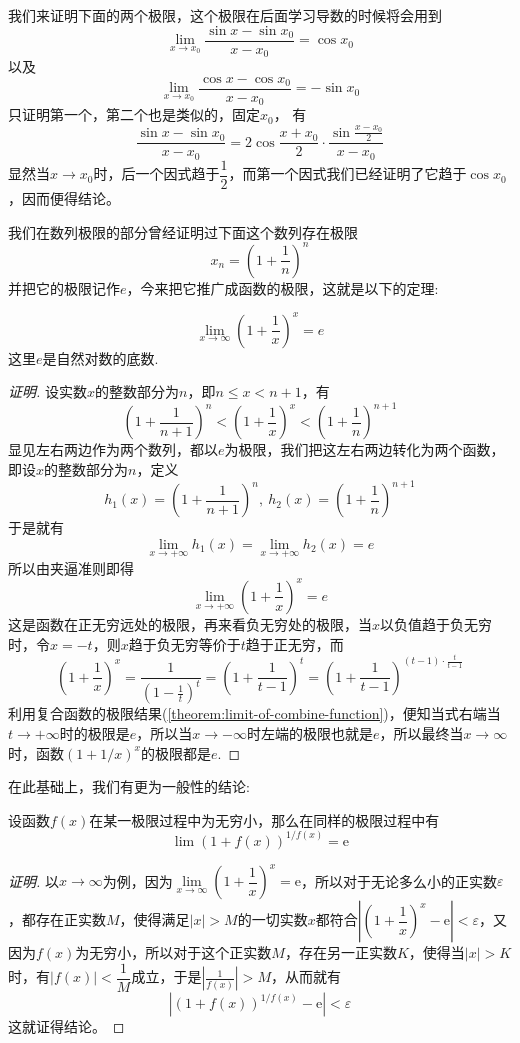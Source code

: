 \begin{example}
  \label{example:limit-of-sinx-sinx0-over-x-x0}
  我们来证明下面的两个极限，这个极限在后面学习导数的时候将会用到
  \[ \lim_{x \to x_0} \frac{\sin{x}-\sin{x_0}}{x-x_0} = \cos{x_0} \]
  以及
  \[ \lim_{x \to x_0} \frac{\cos{x}-\cos{x_0}}{x-x_0} = -\sin{x_0} \]
  只证明第一个，第二个也是类似的，固定$x_0$，
  有
  \[ \frac{\sin{x}-\sin{x_0}}{x-x_0} = 2\cos{\frac{x+x_0}{2}} \cdot \frac{\sin{\frac{x-x_0}{2}}}{x-x_0} \]
  显然当$x \to x_0$时，后一个因式趋于$\dfrac{1}{2}$，而第一个因式我们已经证明了它趋于$\cos{x_0}$，因而便得结论。
\end{example}

我们在数列极限的部分曾经证明过下面这个数列存在极限
\[ x_n = \left( 1+\frac{1}{n} \right)^n \]
并把它的极限记作$e$，今来把它推广成函数的极限，这就是以下的定理:
\begin{theorem}
  \[ \lim_{x \to \infty} \left( 1+\frac{1}{x} \right)^x = e \]
  这里$e$是自然对数的底数.
\end{theorem}

\begin{proof}[证明]
  设实数$x$的整数部分为$n$，即$n \leqslant x < n+1$，有
  \[ \left( 1+\frac{1}{n+1} \right)^n < \left( 1+\frac{1}{x} \right)^x < \left( 1+\frac{1}{n} \right)^{n+1} \]
  显见左右两边作为两个数列，都以$e$为极限，我们把这左右两边转化为两个函数，即设$x$的整数部分为$n$，定义
  \[ h_1(x) =  \left( 1+\frac{1}{n+1} \right)^n, \ h_2(x)=\left( 1+\frac{1}{n} \right)^{n+1} \]
  于是就有
  \[ \lim_{x \to +\infty} h_1(x) = \lim_{x \to +\infty} h_2(x) = e \]
  所以由夹逼准则即得
  \[ \lim_{x \to +\infty} \left( 1+\frac{1}{x} \right)^x = e \]
  这是函数在正无穷远处的极限，再来看负无穷处的极限，当$x$以负值趋于负无穷时，令$x=-t$，则$x$趋于负无穷等价于$t$趋于正无穷，而
  \[ \left( 1+\frac{1}{x} \right)^x = \frac{1}{\left( 1-\frac{1}{t} \right)^t} = \left( 1+\frac{1}{t-1} \right)^t = \left( 1+\frac{1}{t-1} \right)^{(t-1) \cdot \frac{t}{t-1}} \]
  利用复合函数的极限结果(\autoref{theorem:limit-of-combine-function})，便知当式右端当$t \to +\infty$时的极限是$e$，所以当$x \to -\infty$时左端的极限也就是$e$，所以最终当$x \to \infty$时，函数$(1+1/x)^x$的极限都是$e$.
\end{proof}

在此基础上，我们有更为一般性的结论:
\begin{theorem}
  设函数$f(x)$在某一极限过程中为无穷小，那么在同样的极限过程中有
  \[ \lim (1+f(x))^{1/f(x)} = \mathrm{e} \]
\end{theorem}

\begin{proof}[证明]
  以$x \to \infty$为例，因为$\lim\limits_{x \to \infty}(1+\dfrac{1}{x})^x = \mathrm{e}$，所以对于无论多么小的正实数$\varepsilon$，都存在正实数$M$，使得满足$|x|>M$的一切实数$x$都符合$|(1+\dfrac{1}{x})^x-\mathrm{e}|<\varepsilon$，又因为$f(x)$为无穷小，所以对于这个正实数$M$，存在另一正实数$K$，使得当$|x|>K$时，有$|f(x)|<\dfrac{1}{M}$成立，于是$\left| \frac{1}{f(x)} \right|>M$，从而就有
  \[ \left| (1+f(x))^{1/f(x)} - \mathrm{e} \right| < \varepsilon \]
  这就证得结论。
\end{proof}


